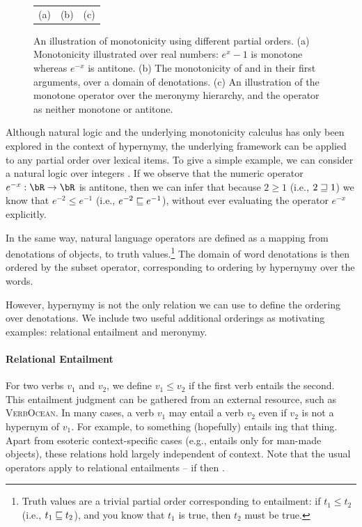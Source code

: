 \begin{figure}
\begin{center}
\begin{tabular}{ccc}
(a) & (b) & (c)
\end{tabular}
\end{center}
\caption{
An illustration of monotonicity using different partial orders.
(a) Monotonicity illustrated over real numbers: $e^x-1$ is monotone whereas
    $e^{-x}$ is antitone.
(b) The monotonicity of  and  in their first arguments, over
    a domain of denotations.
(c) An illustration of the  monotone operator over the meronymy hierarchy,
    and the operator  as neither monotone or antitone.
}
\end{figure}

Although natural logic and the underlying monotonicity calculus has 
  only been explored in the context of hypernymy, the underlying framework
  can be applied to any partial order over lexical items.
To give a simple example, 
  we can consider a natural logic over integers \cite{key:2014icard-natlog}.
If we observe that the numeric operator $e^{-x} : \bR \rightarrow \bR$ is
  antitone, then we can infer that because $2 \geq 1$ (i.e., $2 \sqsupseteq 1$)
  we know that $e^{-2} \leq e^{-1}$ (i.e., $e^{-2} \sqsubseteq e^{-1}$), without
  ever evaluating the operator $e^{-x}$ explicitly.

In the same way, natural language operators are defined as a mapping from
  denotations of objects, to truth values.\footnote{
  Truth values are a trivial partial order corresponding to entailment:
  if \hbox{$t_1 \leq t_2$} 
  (i.e., \hbox{$t_1 \sqsubseteq t_2$}),
  and you know that $t_1$ is true, then $t_2$ must be true.
}
The domain of word denotations is then ordered by the subset operator, corresponding
  to ordering by hypernymy over the words.

However, hypernymy is not the only relation we can use to define the ordering over
  denotations.
We include two useful additional orderings as motivating examples: relational
  entailment and meronymy.

\paragraph{Relational Entailment}
For two verbs $v_1$ and $v_2$, we define $v_1 \leq v_2$ if the first verb
  entails the second.
This entailment judgment can be gathered from an external resource, such as
  \textsc{VerbOcean}\cite{key:chklovski2004verbocean}.
In many cases, a verb $v_1$ may entail a verb $v_2$ even if $v_2$ is not a hypernym of $v_1$.
For example, to  something (hopefully) entails ing that thing.
Apart from esoteric context-specific cases (e.g.,  entails  only
  for man-made objects), these relations hold largely independent of context.
Note that the usual operators apply to relational entailments -- if 
   then .

